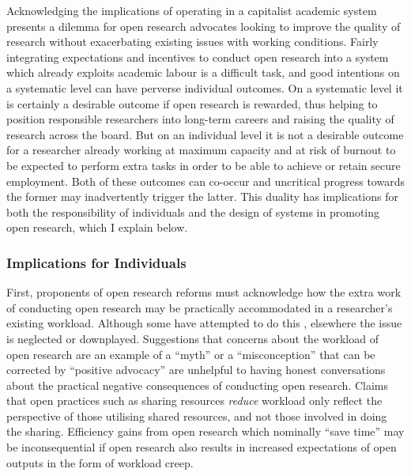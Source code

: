 \documentclass[meta, authordate]{jote-new-article}
\begin{document}
Acknowledging the implications of operating in a capitalist academic system presents a dilemma for open research advocates looking to improve the quality of research without exacerbating existing issues with working conditions. Fairly integrating expectations and incentives to conduct open research into a system which already exploits academic labour is a difficult task, and good intentions on a systematic level can have perverse individual outcomes. On a systematic level it is certainly a desirable outcome if open research is rewarded, thus helping to position responsible researchers into long-term careers and raising the quality of research across the board. But on an individual level it is not a desirable outcome for a researcher already working at maximum capacity and at risk of burnout to be expected to perform extra tasks in order to be able to achieve or retain secure employment. Both of these outcomes can co-occur and uncritical progress towards the former may inadvertently trigger the latter. This duality has implications for both the responsibility of individuals and the design of systems in promoting open research, which I explain below.



\subsubsection{Implications for Individuals}



First, proponents of open research reforms must acknowledge how the extra work of conducting open research may be practically accommodated in a researcher’s existing workload. Although some have attempted to do this \parencites[e.g.][]{Robson2021}, elsewhere the issue is neglected or downplayed. Suggestions that concerns about the workload of open research are an example of a “myth” \parencites{Bastiaansen2019} or a “misconception” that can be corrected by “positive advocacy” \parencites{Hagger2022} are unhelpful to having honest conversations about the practical negative consequences of conducting open research. Claims that open practices such as sharing resources \emph{reduce} workload \parencites{Grahe2020} only reflect the perspective of those utilising shared resources, and not those involved in doing the sharing. Efficiency gains from open research which nominally “save time” \parencites{Lowndes2017} may be inconsequential if open research also results in increased expectations of open outputs in the form of workload creep.
\end{document}
